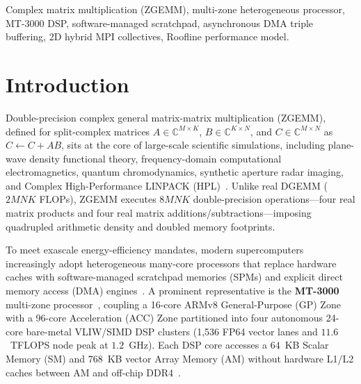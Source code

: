 \documentclass[conference]{IEEEtran}
\begin{document}
\begin{IEEEkeywords}
Complex matrix multiplication (ZGEMM), multi-zone heterogeneous processor, MT-3000 DSP, software-managed scratchpad, asynchronous DMA triple buffering, 2D hybrid MPI collectives, Roofline performance model.
\end{IEEEkeywords}

\section{Introduction}
\label{sec:intro}
Double-precision complex general matrix-matrix multiplication (ZGEMM), defined for split-complex matrices $A \in \mathbb{C}^{M \times K}$, $B \in \mathbb{C}^{K \times N}$, and $C \in \mathbb{C}^{M \times N}$ as $C \leftarrow C + AB$, sits at the core of large-scale scientific simulations, including plane-wave density functional theory, frequency-domain computational electromagnetics, quantum chromodynamics, synthetic aperture radar imaging, and Complex High-Performance LINPACK (HPL)~\cite{barrett2010complexhpl, vanzee2017complex}. Unlike real DGEMM ($2MNK$ FLOPs), ZGEMM executes $8MNK$ double-precision operations---four real matrix products and four real matrix additions/subtractions---imposing quadrupled arithmetic density and doubled memory footprints.

To meet exascale energy-efficiency mandates, modern supercomputers increasingly adopt heterogeneous many-core processors that replace hardware caches with software-managed scratchpad memories (SPMs) and explicit direct memory access (DMA) engines~\cite{kahle2005cell, igual2012dsp, fu2016sunway, jiang2017sw26010}. A prominent representative is the \textbf{MT-3000} multi-zone processor~\cite{lu2022mt3000}, coupling a 16-core ARMv8 General-Purpose (GP) Zone with a 96-core Acceleration (ACC) Zone partitioned into four autonomous 24-core bare-metal VLIW/SIMD DSP clusters (1,536 FP64 vector lanes and $11.6$~TFLOPS node peak at $1.2$~GHz). Each DSP core accesses a $64$~KB Scalar Memory (SM) and $768$~KB vector Array Memory (AM) without hardware L1/L2 caches between AM and off-chip DDR4~\cite{fang2026mtgemm, qi2025constraint}.
\end{document}
